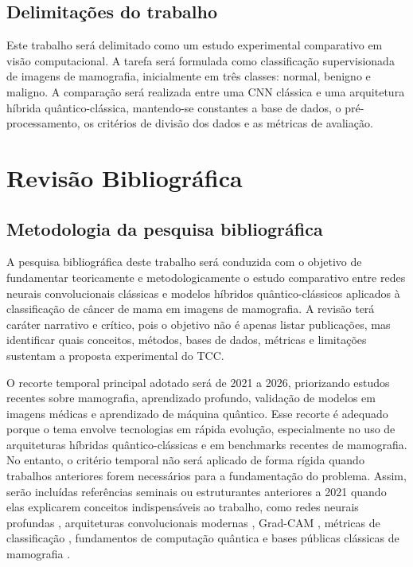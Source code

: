 \documentclass[
    12pt,
    openright,
    oneside,
    a4paper,
    english,
    brazil
]{abntex2}
\begin{document}
\section{Delimitações do trabalho}

Este trabalho será delimitado como um estudo experimental comparativo em visão computacional. A tarefa será formulada como classificação supervisionada de imagens de mamografia, inicialmente em três classes: normal, benigno e maligno. A comparação será realizada entre uma CNN clássica e uma arquitetura híbrida quântico-clássica, mantendo-se constantes a base de dados, o pré-processamento, os critérios de divisão dos dados e as métricas de avaliação.

\chapter{Revisão Bibliográfica}

\section{Metodologia da pesquisa bibliográfica}

A pesquisa bibliográfica deste trabalho será conduzida com o objetivo de fundamentar teoricamente e metodologicamente o estudo comparativo entre redes neurais convolucionais clássicas e modelos híbridos quântico-clássicos aplicados à classificação de câncer de mama em imagens de mamografia. A revisão terá caráter narrativo e crítico, pois o objetivo não é apenas listar publicações, mas identificar quais conceitos, métodos, bases de dados, métricas e limitações sustentam a proposta experimental do TCC.

O recorte temporal principal adotado será de 2021 a 2026, priorizando estudos recentes sobre mamografia, aprendizado profundo, validação de modelos em imagens médicas e aprendizado de máquina quântico. Esse recorte é adequado porque o tema envolve tecnologias em rápida evolução, especialmente no uso de arquiteturas híbridas quântico-clássicas e em benchmarks recentes de mamografia. No entanto, o critério temporal não será aplicado de forma rígida quando trabalhos anteriores forem necessários para a fundamentação do problema. Assim, serão incluídas referências seminais ou estruturantes anteriores a 2021 quando elas explicarem conceitos indispensáveis ao trabalho, como redes neurais profundas \cite{LeCun2015,goodfellow2016deep}, arquiteturas convolucionais modernas \cite{he2016resnet}, Grad-CAM \cite{selvaraju2020gradcam}, métricas de classificação \cite{fawcett2006roc,hand2001simple}, fundamentos de computação quântica \cite{nielsen2010quantum,preskill2018nisq} e bases públicas clássicas de mamografia \cite{moreira2012inbreast,lee2017cbisddsm}.
\end{document}
